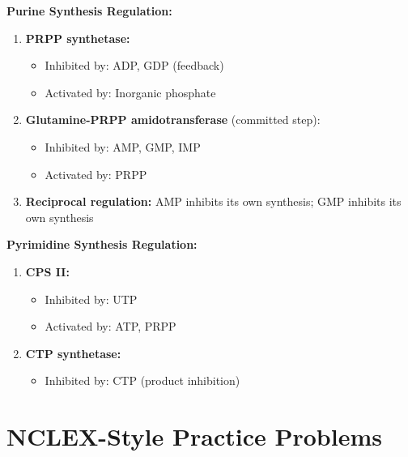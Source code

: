 \textbf{Purine Synthesis Regulation:}

\begin{enumerate}
    \item \textbf{PRPP synthetase:}
    \begin{itemize}
        \item Inhibited by: ADP, GDP (feedback)
        \item Activated by: Inorganic phosphate
    \end{itemize}
    
    \item \textbf{Glutamine-PRPP amidotransferase} (committed step):
    \begin{itemize}
        \item Inhibited by: AMP, GMP, IMP
        \item Activated by: PRPP
    \end{itemize}
    
    \item \textbf{Reciprocal regulation:} AMP inhibits its own synthesis; GMP inhibits its own synthesis
\end{enumerate}

\textbf{Pyrimidine Synthesis Regulation:}

\begin{enumerate}
    \item \textbf{CPS II:}
    \begin{itemize}
        \item Inhibited by: UTP
        \item Activated by: ATP, PRPP
    \end{itemize}
    
    \item \textbf{CTP synthetase:}
    \begin{itemize}
        \item Inhibited by: CTP (product inhibition)
    \end{itemize}
\end{enumerate}


\section{NCLEX-Style Practice Problems}

